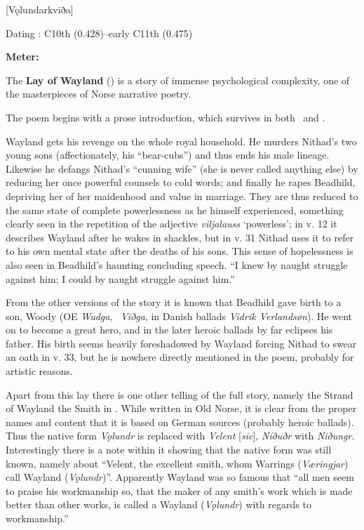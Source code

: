 [Vǫlundarkviða]

\begin{flushright}%
Dating \parencite{Sapp2022}: C10th (0.428)–early C11th (0.475)

\textbf{Meter: }\Fornyrdislag%
\end{flushright}%


The \textbf{Lay of Wayland} (\Volundarkvida) is a story of immense psychological complexity, one of the masterpieces of Norse narrative poetry.

The poem begins with a prose introduction, which survives in both \Regius\ and \AM.

Wayland gets his revenge on the whole royal household. He murders Nithad’s two young sons (affectionately, his “bear-cubs”) and thus ends his male lineage. Likewise he defangs Nithad’s “cunning wife” (she is never called anything else) by reducing her once powerful counsels to cold words; and finally he rapes Beadhild, depriving her of her maidenhood and value in marriage. They are thus reduced to the same state of complete powerlessness as he himself experienced, something clearly seen in the repetition of the adjective \emph{viljalauss} ‘powerless’; in v. 12 it describes Wayland after he wakes in shackles, but in v. 31 Nithad uses it to refer to his own mental state after the deaths of his sons. This sense of hopelessness is also seen in Beadhild’s haunting concluding speech. “I knew by naught struggle against him; I could by naught struggle against him.”

From the other versions of the story it is known that Beadhild gave birth to a son, Woody (OE \emph{Wudga}, \ThidreksSaga\ \emph{Viðga}, in Danish ballads \emph{Vidrik Verlandsøn}). He went on to become a great hero, and in the later heroic ballads by far eclipses his father. His birth seems heavily foreshadowed by Wayland forcing Nithad to swear an oath in v. 33, but he is nowhere directly mentioned in the poem, probably for artistic reasons.

Apart from this lay there is one other telling of the full story, namely the Strand of Wayland the Smith in \ThidreksSaga. While written in Old Norse, it is clear from the proper names and content that it is based on German sources (probably heroic ballads). Thus the native form \emph{Vǫlundr} is replaced with \emph{Velent} [\emph{sic}], \emph{Níðuðr} with \emph{Niðungr}. Interestingly there is a note within it showing that the native form was still known, namely about “Velent, the excellent smith, whom Warrings (\emph{Væringjar}) call Wayland (\emph{Vǫlundr})”. Apparently Wayland was so famous that “all men seem to praise his workmanship so, that the maker of any smith’s work which is made better than other works, is called a Wayland (\emph{Vǫlundr}) with regards to workmanship.”

